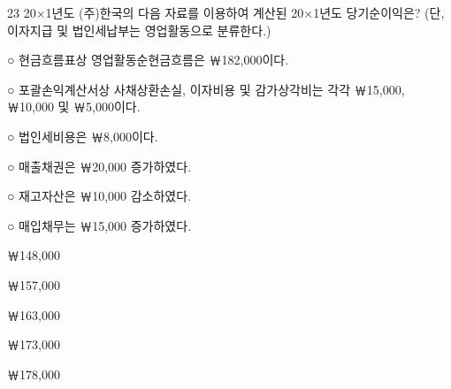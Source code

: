 \begin{question}{23}
20×1년도 (주)한국의 다음 자료를 이용하여 계산된 20×1년도 당기순이익은? (단, 이자지급 및 법인세납부는 영업활동으로 분류한다.)
\begin{framedtext}
○ 현금흐름표상 영업활동순현금흐름은 ￦182,000이다. \par
○ 포괄손익계산서상 사채상환손실, 이자비용 및 감가상각비는 각각 ￦15,000, ￦10,000 및 ￦5,000이다. \par
○ 법인세비용은 ￦8,000이다. \par
○ 매출채권은 ￦20,000 증가하였다. \par
○ 재고자산은 ￦10,000 감소하였다. \par
○ 매입채무는 ￦15,000 증가하였다. \par
\end{framedtext}
\begin{choices}
  \item ￦148,000
  \item ￦157,000
  \item ￦163,000
  \item ￦173,000
  \item ￦178,000
\end{choices}
\end{question}
